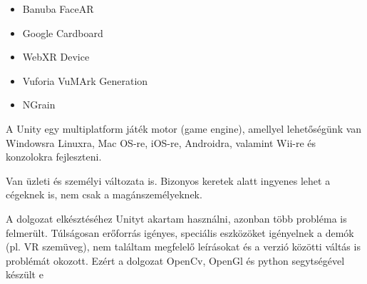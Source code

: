 \begin{itemize}
\item Banuba FaceAR
\item Google Cardboard
\item WebXR Device 
\item Vuforia VuMArk Generation
\item NGrain
\end{itemize}


A Unity egy multiplatform játék motor (game engine), amellyel lehetőségünk van Windowsra Linuxra, Mac OS-re, iOS-re, Androidra, valamint Wii-re és konzolokra fejleszteni.

Van üzleti és személyi változata is. Bizonyos keretek alatt ingyenes lehet a cégeknek is, nem csak a magánszemélyeknek.

A dolgozat elkésztéséhez Unityt akartam használni, azonban több probléma is felmerült. Túlságosan erőforrás igényes, speciális eszközöket igényelnek a demók (pl. VR szemüveg), nem találtam megfelelő leírásokat és a verzió közötti váltás is problémát okozott. Ezért a dolgozat OpenCv, OpenGl és python segytségével készült e
